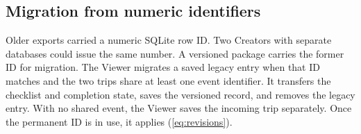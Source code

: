 \subsection{Migration from numeric identifiers}
Older exports carried a numeric SQLite row ID. Two Creators with separate databases could issue the same number. A versioned package carries the former ID for migration. The Viewer migrates a saved legacy entry when that ID matches and the two trips share at least one event identifier. It transfers the checklist and completion state, saves the versioned record, and removes the legacy entry. With no shared event, the Viewer saves the incoming trip separately. Once the permanent ID is in use, it applies (\ref{eq:revisions}).

